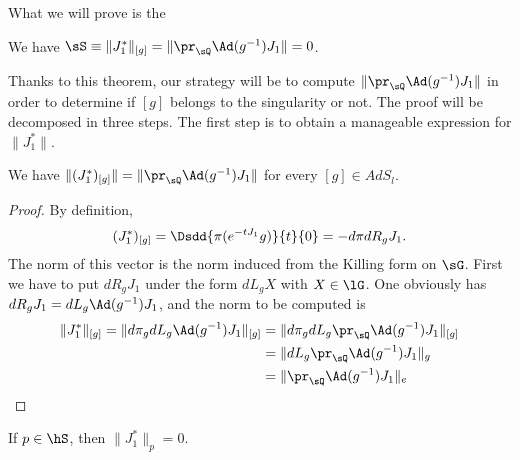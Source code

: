What we will prove is the
\begin{theorem}        \label{LONGThosSequivJzero}
    We have $\sS\equiv \| J_1^* \|_{[g]}=\| \pr_{\sQ}\Ad(g^{-1})J_1 \|=0$.
\end{theorem}

Thanks to this theorem, our strategy will be to compute $\| \pr_{\sQ}\Ad(g^{-1})J_1 \|$ in order to determine if $[g]$ belongs to the singularity or not. The proof will be decomposed in three steps. The first step is to obtain a manageable expression for $\| J_1^* \|$.

\begin{lemma}        \label{LONGLemExpressionCoolNormJUn}
    We have $\| (J_1^*)_{[g]} \|=\| \pr_{\sQ}\Ad(g^{-1})J_1 \|$ for every $[g]\in AdS_l$.
\end{lemma}




\begin{proof}
    By definition, 
    \begin{equation}
        (J_1^*)_{[g]}=\Dsdd{ \pi( e^{-tJ_1}g) }{t}{0}=-d\pi dR_g J_1.
    \end{equation}
    The norm of this vector is the norm induced from the Killing form on $\sG$\cite{Kerin}. First we have to put $dR_g J_1$ under the form $dL_g X$ with $X\in \lG$. One obviously has $dR_g J_1=dL_g\Ad(g^{-1})J_1$, and the norm to be computed is
    \begin{equation}
        \begin{aligned}[]
            \| J_1^* \|_{[g]}=\| d\pi_gdL_g\Ad(g^{-1})J_1\|_{[g]}&=  \|  d\pi_gdL_g\pr_{\sQ}\Ad(g^{-1})J_1\|_{[g]}\\ 
            &= \| dL_g\pr_{\sQ}\Ad(g^{-1})J_1 \|_{g} \\
            &=\| \pr_{\sQ}\Ad(g^{-1})J_1 \|_e
        \end{aligned}
    \end{equation}
\end{proof}


\begin{proposition}        \label{LONGPropPtpsSjzero}
    If $p\in\hS$, then $\| J_1^* \|_p=0$.
\end{proposition}

